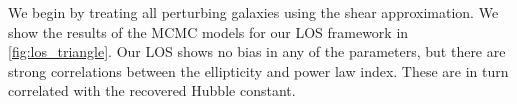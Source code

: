 We begin by treating all perturbing galaxies using the shear approximation. We show the results of the MCMC models for our LOS framework in \ref{fig:los_triangle}. Our LOS shows no bias in any of the parameters, but there are strong correlations between the ellipticity and power law index. These are in turn correlated with the recovered Hubble constant. 